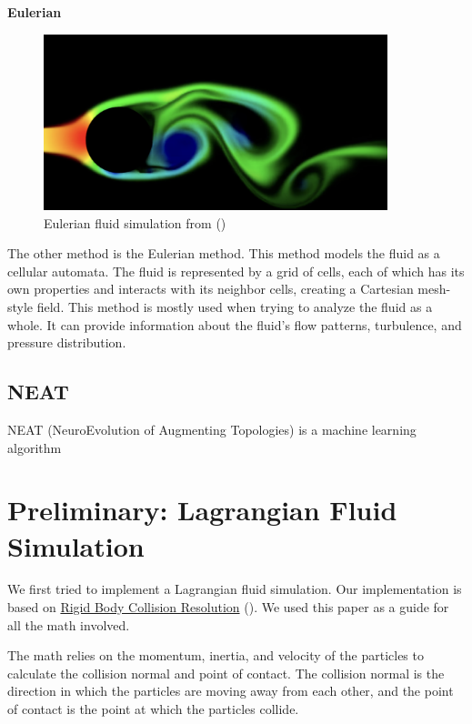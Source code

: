 \documentclass[a4paper,12pt]{article}
\begin{document}
\textbf{Eulerian} \\

\begin{figure}[H]
	\centering
	\includegraphics[width=10cm]{resources/eulerian.png}
	\caption{Eulerian fluid simulation from (\cite{tenminute})}
\end{figure}

The other method is the Eulerian method. This method models the fluid as a
cellular automata. The fluid is represented by a grid of cells, each of which
has its own properties and interacts with its neighbor cells, creating a Cartesian
mesh-style field. This method is mostly used when trying to analyze the fluid as a whole.
It can provide information about the fluid's flow patterns, turbulence, and pressure distribution. 

\subsection{NEAT}
NEAT (NeuroEvolution of Augmenting Topologies) is a machine learning algorithm

\pagebreak
\section{Preliminary: Lagrangian Fluid Simulation}
We first tried to implement a Lagrangian fluid simulation.
Our implementation is based on \hyperlink{http://www.hakenberg.de/diffgeo/collision_resolution.htm}{Rigid Body Collision Resolution}
(\cite{hakenberg}). We used this paper as a guide for all the math involved.

The math relies on the momentum, inertia, and velocity of the particles to
calculate the collision normal and point of contact. The collision normal is
the direction in which the particles are moving away from each other, and the
point of contact is the point at which the particles collide.
\end{document}
